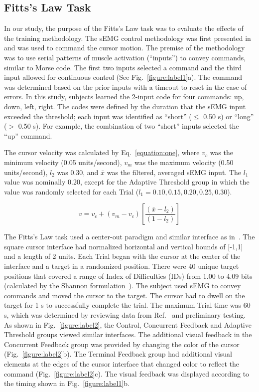 \subsection{Fitts's Law Task}
In our study, the purpose of the Fitts's Law task was to evaluate the effects of the training methodology.
The sEMG control methodology was first presented in~\cite{RN45} and was used to command the cursor motion.
The premise of the methodology was to use serial patterns of muscle activation (``inputs'') to convey commands, similar to Morse code.
The first two inputs selected a command and the third input allowed for continuous control (See Fig.~\ref{figure:label1}a).
The command was determined based on the prior inputs with a timeout to reset in the case of errors.
In this study, subjects learned the 2-input code for four commands: up, down, left, right.
The codes were defined by the duration that the sEMG input exceeded the threshold; each input was identified as ``short'' ($\leq$ 0.50 s) or ``long'' ($>$ 0.50 s).
For example, the combination of two ``short'' inputs selected the ``up'' command.

The cursor velocity was calculated by Eq.~\ref{equation:one}, where $v_c$ was the minimum velocity (0.05 units/second), $v_m$ was the maximum velocity (0.50 units/second), $l_2$ was 0.30, and $\bar{x}$ was the filtered, averaged sEMG input.
The $l_1$ value was nominally 0.20, except for the Adaptive Threshold group in which the value was randomly selected for each Trial ($l_1 = 0.10, 0.15, 0.20, 0.25, 0.30$).

\begin{equation}
	\label{equation:one}
	v= v_c+\left(v_m-v_c\right)\left[\frac{\left(\bar{x}-l_2\right)}{\left(1-l_2\right)}\right]
\end{equation}

The Fitts's Law task used a center-out paradigm and similar interface as in~\cite{RN45}.
The square cursor interface had normalized horizontal and vertical bounds of [-1,1] and a length of 2 units.
Each Trial began with the cursor at the center of the interface and a target in a randomized position.
There were 40 unique target positions that covered a range of Index of Difficulties (IDs) from 1.00 to 4.09 bits (calculated by the Shannon formulation~\cite{RN50}).
The subject used sEMG to convey commands and moved the cursor to the target.
The cursor had to dwell on the target for 1 s to successfully complete the trial.
The maximum Trial time was 60 s, which was determined by reviewing data from Ref.~\cite{RN45} and preliminary testing.
As shown in Fig.~\ref{figure:label2}, the Control, Concurrent Feedback and Adaptive Threshold groups viewed similar interfaces.
The additional visual feedback in the Concurrent Feedback group was provided by changing the color of the cursor (Fig.~\ref{figure:label2}b).
The Terminal Feedback group had additional visual elements at the edges of the cursor interface that changed color to reflect the command (Fig.~\ref{figure:label2}c).
The visual feedback was displayed according to the timing shown in Fig.~\ref{figure:label1}b.

